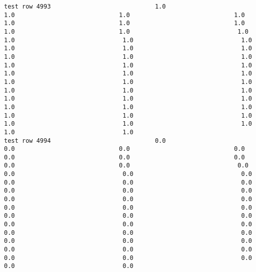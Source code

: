 \documentclass[11pt]{article}
\begin{document}
\begin{verbatim}
test row 4993                             1.0                             1.0                             1.0                             1.0                             1.0                             1.0                             1.0                             1.0                             1.0                              1.0                              1.0                              1.0                              1.0                              1.0                              1.0                              1.0                              1.0                              1.0                              1.0                              1.0                              1.0                              1.0                              1.0                              1.0                              1.0                              1.0                              1.0                              1.0                              1.0                              1.0                              1.0                              1.0                              1.0                              1.0                              1.0                              1.0                              1.0                              1.0                              1.0                              1.0                              1.0                              1.0                              1.0                              1.0                              1.0
test row 4994                             0.0                             0.0                             0.0                             0.0                             0.0                             0.0                             0.0                             0.0                             0.0                              0.0                              0.0                              0.0                              0.0                              0.0                              0.0                              0.0                              0.0                              0.0                              0.0                              0.0                              0.0                              0.0                              0.0                              0.0                              0.0                              0.0                              0.0                              0.0                              0.0                              0.0                              0.0                              0.0                              0.0                              0.0                              0.0                              0.0                              0.0                              0.0                              0.0                              0.0                              0.0                              0.0                              0.0                              0.0                              0.0

\end{verbatim}
\end{document}
